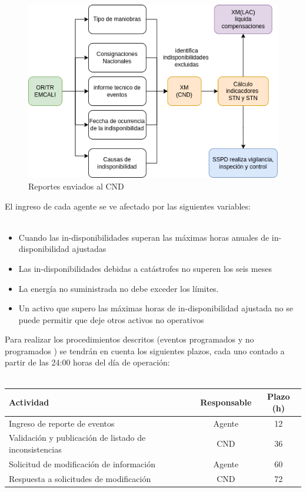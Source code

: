 \documentclass[a5paper]{book}%
\begin{document}
\begin{figure}[H]
  \centering
  
  \caption{Reportes enviados al CND}
  \label{fig:reportes_transmision}
  \includegraphics[width=\linewidth ]{reportes_transmision}
\end{figure}

El ingreso de cada agente se ve afectado por las siguientes variables:\\\\

\begin{itemize}
\item Cuando las in-disponibilidades superan las máximas horas anuales de in-disponibilidad ajustadas
\item Las in-disponibilidades debidas a catástrofes no superen los seis meses
\item La energía no suministrada no debe exceder los límites.
\item Un activo que supero las máximas horas de in-disponibilidad ajustada no se puede permitir que deje otros activos no operativos
\end{itemize}


Para realizar los procedimientos descritos (eventos programados y no programados ) se tendrán en cuenta los siguientes plazos, cada uno contado a partir de las 24:00 horas del día de operación:\\\\

\begin{tabular}[H]{|p{4cm}|c|c|}
  \hline
Actividad & Responsable&Plazo (h)\\\hline
Ingreso de reporte de eventos &Agente&12\\\hline
Validación y publicación de listado de inconsistencias&
CND&
36\\\hline
Solicitud de modificación de información&
Agente&
60\\\hline
Respuesta a solicitudes de modificación&
CND&
72\\\hline
  \end{tabular}
\end{document}
